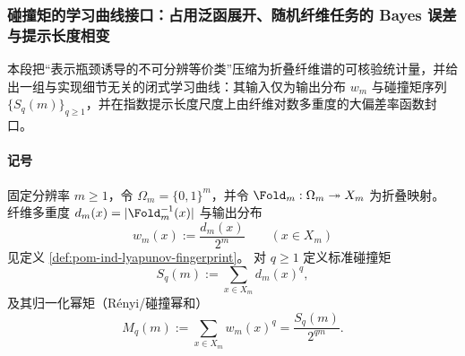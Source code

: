 
\subsubsection{碰撞矩的学习曲线接口：占用泛函展开、随机纤维任务的 Bayes 误差与提示长度相变}\label{subsubsec:pom-icl-collision-learning-curves}
本段把“表示瓶颈诱导的不可分辨等价类”压缩为折叠纤维谱的可核验统计量，并给出一组与实现细节无关的闭式学习曲线：其输入仅为输出分布 \(w_m\) 与碰撞矩序列 \(\{S_q(m)\}_{q\ge 1}\)，并在指数提示长度尺度上由纤维对数多重度的大偏差率函数封口。

\paragraph{记号}
固定分辨率 \(m\ge 1\)，令 \(\Omega_m=\{0,1\}^m\)，并令 \(\Fold_m:\Omega_m\twoheadrightarrow X_m\) 为折叠映射。
纤维多重度 \(d_m(x)=|\Fold_m^{-1}(x)|\) 与输出分布
\[
w_m(x):=\frac{d_m(x)}{2^m}\qquad(x\in X_m)
\]
见定义 \ref{def:pom-ind-lyapunov-fingerprint}。
对 \(q\ge 1\) 定义标准碰撞矩
\[
S_q(m):=\sum_{x\in X_m}d_m(x)^q,
\]
及其归一化幂矩（Rényi/碰撞幂和）
\[
M_q(m):=\sum_{x\in X_m}w_m(x)^q=\frac{S_q(m)}{2^{qm}}.
\]

